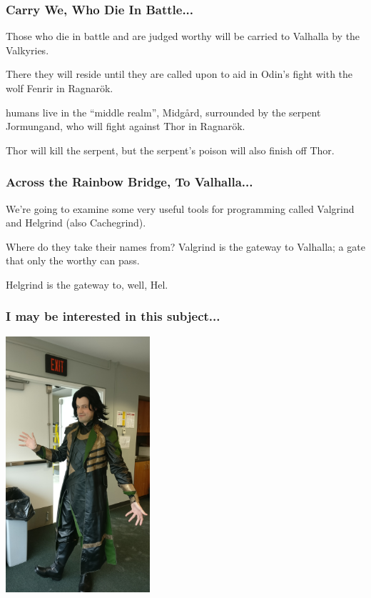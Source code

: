 \begin{frame}
	\frametitle{Carry We, Who Die In Battle...}

	Those who die in battle and are judged worthy will be carried to Valhalla by the Valkyries.

	There they will reside until they are called upon to aid in Odin's fight with the wolf Fenrir in Ragnar\"ok.

	humans live in the ``middle realm'', Midg\aa rd, surrounded by the serpent Jormungand, who will fight against Thor in  Ragnar\"ok.

	Thor will kill the serpent, but the serpent's poison will also finish off Thor.

\end{frame}

\begin{frame}
	\frametitle{Across the Rainbow Bridge, To Valhalla...}

	We're going to examine some very useful tools for programming called Valgrind and Helgrind (also Cachegrind).

	Where do they take their names from? Valgrind is the gateway to Valhalla; a gate that only the worthy can pass.

	Helgrind is the gateway to, well, Hel.
\end{frame}


\begin{frame}
	\frametitle{I may be interested in this subject...}

	\begin{center}
		\includegraphics[width=0.4\textwidth]{images/Loki.jpg}
	\end{center}

\end{frame}



